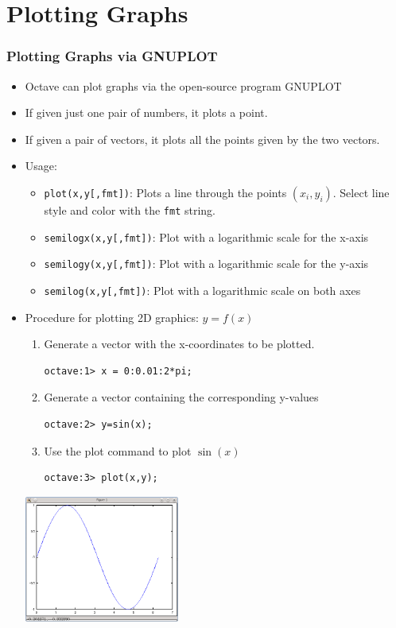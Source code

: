 \documentclass[t,compress,xcolor=svgnames]{beamer}
\begin{document}
\section{Plotting Graphs}
\begin{frame}
  \frametitle{\small Plotting Graphs via GNUPLOT}
  \begin{itemize}
    \item Octave can plot graphs via the open-source program GNUPLOT
    \item If given just one pair of numbers, it plots a point.
    \item If given a pair of vectors, it plots all the points given by the two vectors.
    \item Usage:
    \begin{itemize}
      \item \texttt{plot(x,y[,fmt])}: Plots a line through the points $(x_i,y_i)$. Select line style and color with the \texttt{fmt} string.
      \item \texttt{semilogx(x,y[,fmt])}: Plot with a logarithmic scale for the x-axis
      \item \texttt{semilogy(x,y[,fmt])}: Plot with a logarithmic scale for the y-axis
      \item \texttt{semilog(x,y[,fmt])}: Plot with a logarithmic scale on both axes
    \end{itemize}
    \framebreak
    \item Procedure for plotting 2D graphics: $y=f(x)$
    \begin{enumerate}
      \item Generate a vector with the x-coordinates to be plotted.
      \begin{verbatim}
octave:1> x = 0:0.01:2*pi;
      \end{verbatim}
      \item Generate a vector containing the corresponding y-values
      \begin{verbatim}
octave:2> y=sin(x);
      \end{verbatim}
      \item Use the plot command to plot $\sin(x)$
      \begin{verbatim}
octave:3> plot(x,y);
      \end{verbatim}
    \end{enumerate}
    \begin{center}
      \includegraphics[width=0.4\textwidth]{./octave-plot-sinx}

\end{center}
\end{itemize}
\end{frame}
\end{document}
